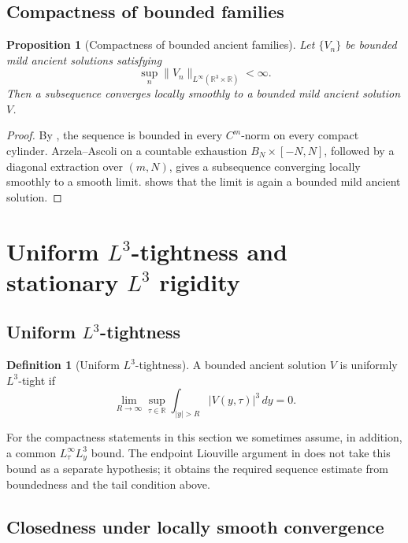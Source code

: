 \documentclass[11pt]{amsart}
\theoremstyle{plain}
\newtheorem{proposition}[proposition]{Proposition}
\theoremstyle{definition}
\newtheorem{definition}[definition]{Definition}
\theoremstyle{remark}
\numberwithin{equation}{section}
\newcommand{\R}{\mathbb R}
\begin{document}
\subsection{Compactness of bounded families}

\begin{proposition}[Compactness of bounded ancient families]
\label{p2:prop:bounded-compactness}
Let \(\{V_n\}\) be bounded mild ancient solutions satisfying
\[
   \sup_n\|V_n\|_{L^\infty(\R^3\times\R)}<\infty .
\]
Then a subsequence converges locally smoothly to a bounded mild ancient
solution \(V\).
\end{proposition}

\begin{proof}
By , the sequence is bounded in every
\(C^m\)-norm on every compact cylinder.  Arzela--Ascoli on a countable
exhaustion \(B_N\times[-N,N]\), followed by a diagonal extraction over
\((m,N)\), gives a subsequence converging locally smoothly to a smooth limit.
 shows that the limit is again a bounded mild ancient
solution.
\end{proof}

\section{\texorpdfstring{Uniform \(L^3\)-tightness and stationary \(L^3\) rigidity}{Uniform L3-tightness and stationary L3 rigidity}}
\label{p2:sec:tightness-rigidity}

\subsection{\texorpdfstring{Uniform \(L^3\)-tightness}{Uniform L3-tightness}}

\begin{definition}[Uniform \(L^3\)-tightness]\label{p2:def:L3-tight}
A bounded ancient solution \(V\) is uniformly \(L^3\)-tight if
\[
   \lim_{R\to\infty}
   \sup_{\tau\in\R}
   \int_{|y|>R}|V(y,\tau)|^3\,dy=0 .
\]
\end{definition}

For the compactness statements in this section we sometimes assume, in
addition, a common \(L^\infty_\tau L^3_y\) bound.  The endpoint Liouville
argument in  does not take this bound as a
separate hypothesis; it obtains the required sequence estimate from boundedness
and the tail condition above.

\subsection{Closedness under locally smooth convergence}
\end{document}
